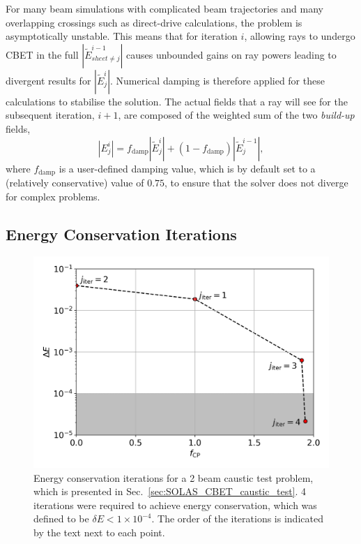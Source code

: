 For many beam simulations with complicated beam trajectories and many overlapping crossings such as direct-drive calculations, the problem is asymptotically unstable.
This means that for iteration $i$, allowing rays to undergo \ac{CBET} in the full $|\tilde{E}_{sheet\neq j}^{i-1}|$ causes unbounded gains on ray powers leading to divergent results for $|\tilde{E}_{j}^{i}|$.
Numerical damping is therefore applied for these calculations to stabilise the solution.
The actual fields that a ray will see for the subsequent iteration, $i+1$, are composed of the weighted sum of the two \textit{build-up} fields,
\begin{equation}
    |E_{j}^{i}| = f_{\text{damp}}|\tilde{E}_{j}^{i}| + (1-f_{\text{damp}})|\tilde{E}_{j}^{i-1}|,
\end{equation}
where $f_{\text{damp}}$ is a user-defined damping value, which is by default set to a (relatively conservative) value of $0.75$, to ensure that the solver does not diverge for complex problems.

\subsection{Energy Conservation Iterations}%
\label{sec:energy_conserv_iters}

\begin{figure}[t!]
    \includegraphics[width=0.6\linewidth]{Numerics/Images/delE_minimisation.png}
    \centering
    \caption{Energy conservation iterations for a 2 beam caustic test problem, which is presented in Sec.~\ref{sec:SOLAS_CBET_caustic_test}.
    4 iterations were required to achieve energy conservation, which was defined to be $\delta E<1\times 10^{-4}$.
    The order of the iterations is indicated by the text next to each point.}%
    \label{fig:SOLAS_delE_minimisation}
\end{figure}


